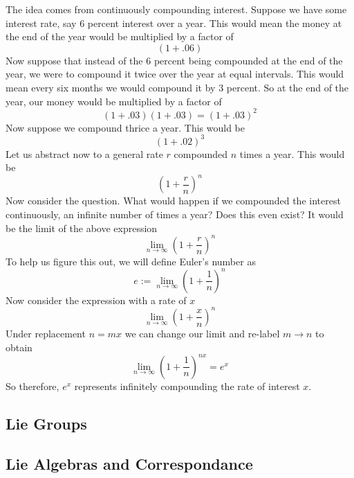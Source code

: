 \documentclass[12pt]{article}
\theoremstyle{definition}
\theoremstyle{remark}
\theoremstyle{example}
\theoremstyle{theorem}
\theoremstyle{lemma}
\begin{document}
The idea comes from continuously compounding interest. Suppose we have some interest rate, say 6 percent interest over a year. This would mean the money at the end of the year would be multiplied by a factor of 
\begin{equation}
	(1+.06)
\end{equation}
Now suppose that instead of the 6 percent being compounded at the end of the year, we were to compound it twice over the year at equal intervals. This would mean every six months we would compound it by 3 percent. So at the end of the year, our money would be multiplied by a factor of
\begin{equation}
	(1+.03)(1+.03)=(1+.03)^2
\end{equation}
Now suppose we compound thrice a year. This would be
\begin{equation}
	(1+.02)^3
\end{equation}
Let us abstract now to a general rate $r$ compounded $n$ times a year. This would be
\begin{equation}
	(1+\frac{r}{n})^n
\end{equation}
Now consider the question. What would happen if we compounded the interest continuously, an infinite number of times a year? Does this even exist? It would be the limit of the above expression
\begin{equation}
	\lim_{n\to\infty}(1+\frac{r}{n})^n
\end{equation}
To help us figure this out, we will define Euler's number as
\begin{equation}
	e:=\lim_{n\to\infty}(1+\frac{1}{n})^n
\end{equation}
Now consider the expression with a rate of $x$
\begin{equation}
	\lim_{n\to\infty}(1+\frac{x}{n})^{n}
\end{equation}
Under replacement $n=mx$ we can change our limit and re-label $m\to n$ to obtain
\begin{equation}
	\lim_{n\to\infty}(1+\frac{1}{n})^{nx}=e^x
\end{equation}
So therefore, $e^x$ represents infinitely compounding the rate of interest $x$.
\subsection{Lie Groups}

\subsection{Lie Algebras and Correspondance}
\end{document}
